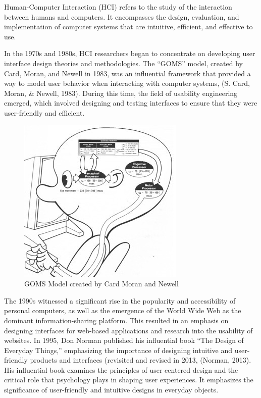 \documentclass[print]{nuthesis}
\begin{document}
Human-Computer Interaction (HCI) refers to the study of the interaction between humans and computers. It encompasses the design, evaluation, and implementation of computer systems that are intuitive, efficient, and effective to use.

In the 1970s and 1980s, HCI researchers began to concentrate on developing user interface design theories and methodologies.
The ``GOMS'' model, created by Card, Moran, and Newell in 1983, was an influential framework that provided a way to model user behavior when interacting with computer systems, (S. Card, Moran, \& Newell, 1983).
During this time, the field of usability engineering emerged, which involved designing and testing interfaces to ensure that they were user-friendly and efficient.

\begin{figure}

{\centering \includegraphics[width=0.45\linewidth]{figure/goms_model} 

}

\caption{GOMS Model created by Card Moran and Newell}\label{fig:gomsmodel}
\end{figure}

The 1990s witnessed a significant rise in the popularity and accessibility of personal computers, as well as the emergence of the World Wide Web as the dominant information-sharing platform.
This resulted in an emphasis on designing interfaces for web-based applications and research into the usability of websites.
In 1995, Don Norman published his influential book ``The Design of Everyday Things,'' emphasizing the importance of designing intuitive and user-friendly products and interfaces (revisited and revised in 2013, (Norman, 2013).
His influential book examines the principles of user-centered design and the critical role that psychology plays in shaping user experiences.
It emphasizes the significance of user-friendly and intuitive designs in everyday objects.
\end{document}

